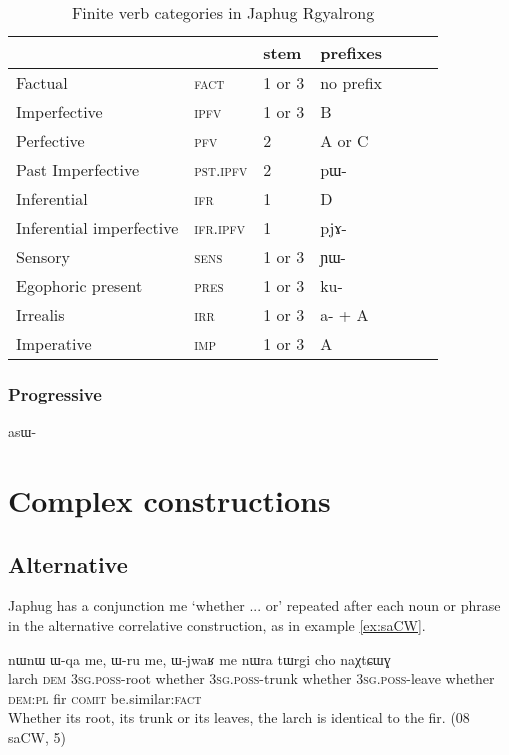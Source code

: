 \documentclass[oldfontcommands,oneside,a4paper,11pt]{article}
\newcommand{\ipa}[1]{{\phon #1}} %
\begin{document}
\begin{table}[H]
\caption{Finite verb categories in Japhug Rgyalrong} \label{tab:finite.forms} \centering
\begin{tabular}{lllllll}
\toprule
&	&	stem&	prefixes\\
\midrule
Factual&	\textsc{fact} &	1 or 3&	no prefix\\
Imperfective&	\textsc{ipfv} &	1 or 3&	B\\
Perfective&	\textsc{pfv} &	2&	A or C\\
Past Imperfective&	\textsc{pst.ipfv} &	2&	\ipa{pɯ-}\\
Inferential&	\textsc{ifr} &	1&	D\\
Inferential imperfective&	\textsc{ifr.ipfv} &	1&	\ipa{pjɤ-}\\
Sensory&	\textsc{sens} &	1 or 3&	\ipa{ɲɯ-}\\
Egophoric present&	\textsc{pres} &	1 or 3&	\ipa{ku-}\\
Irrealis&	\textsc{irr} &	1 or 3&	\ipa{a-} + A\\
Imperative&	\textsc{imp} &	1 or 3&	A\\
\bottomrule
\end{tabular}
\end{table}

\subsubsection{Progressive}
\ipa{asɯ-}


\section{Complex constructions} 

    
\subsection{Alternative}
 Japhug has a conjunction \ipa{me}  `whether ... or' repeated after each noun or phrase in the alternative correlative construction, as in example \ref{ex:saCW}.
 
\begin{exe}
\ex \label{ex:saCW}
\gll  \ipa{saɕɯ} 	\ipa{nɯnɯ} 	\ipa{ɯ-qa} 	\ipa{me,} 	\ipa{ɯ-ru} 	\ipa{me,} 	\ipa{ɯ-jwaʁ} 	\ipa{me} 	\ipa{nɯra} 	\ipa{tɯrgi} 	\ipa{cho} 	\ipa{naχtɕɯɣ} \\
 larch \textsc{dem} \textsc{3sg.poss}-root whether \textsc{3sg.poss}-trunk whether \textsc{3sg.poss}-leave whether \textsc{dem:pl} fir  \textsc{comit} be.similar:\textsc{fact} \\
\glt Whether its root, its trunk or its leaves, the larch is identical to the fir. (08 saCW, 5)
\end{exe} 
\end{document}
